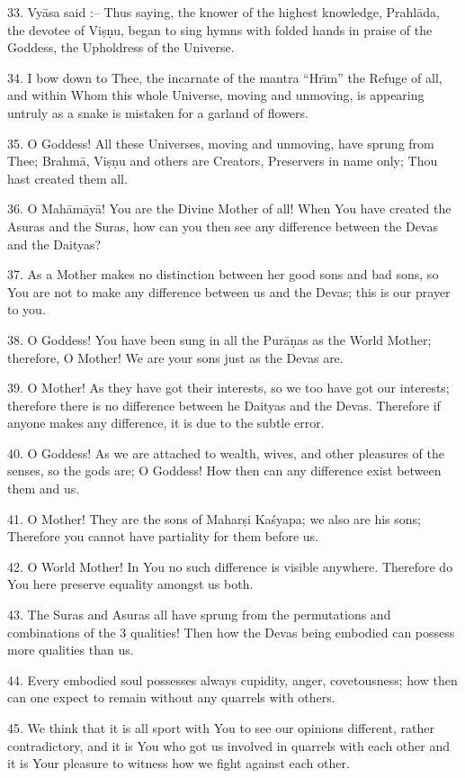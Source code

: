33. Vy\=asa said :-- Thus saying, the knower of the highest knowledge, Prahl\=ada, the devotee of Vi\d{s}\d{n}u, began to sing hymns with folded hands in praise of the Goddess, the Upholdress of the Universe.

34. I bow down to Thee, the incarnate of the mantra ``Hr\={\i}m'' the Refuge of all, and within Whom this whole Universe, moving and unmoving, is appearing untruly as a snake is mistaken for a garland of flowers.

35. O Goddess! All these Universes, moving and unmoving, have sprung from Thee; Brahm\=a, Vi\d{s}\d{n}u and others are Creators, Preservers in name only; Thou hast created them all.

36. O Mah\=am\=ay\=a! You are the Divine Mother of all! When You have created the Asuras and the Suras, how can you then see any difference between the Devas and the Daityas?

37. As a Mother makes no distinction between her good sons and bad sons, so You are not to make any difference between us and the Devas; this is our prayer to you.

38. O Goddess! You have been sung in all the Pur\=a\d{n}as as the World Mother; therefore, O Mother! We are your sons just as the Devas are.

39. O Mother! As they have got their interests, so we too have got our interests; therefore there is no difference between he Daityas and the Devas. Therefore if anyone makes any difference, it is due to the subtle error.

40. O Goddess! As we are attached to wealth, wives, and other pleasures of the senses, so the gods are; O Goddess! How then can any difference exist between them and us.

41. O Mother! They are the sons of Mahar\d{s}i Ka\'syapa; we also are his sons; Therefore you cannot have partiality for them before us.

42. O World Mother! In You no such difference is visible anywhere. Therefore do You here preserve equality amongst us both.

43. The Suras and Asuras all have sprung from the permutations and combinations of the 3 qualities! Then how the Devas being embodied can possess more qualities than us.

44. Every embodied soul possesses always cupidity, anger, covetousness; how then can one expect to remain without any quarrels with others.

45. We think that it is all sport with You to see our opinions different, rather contradictory, and it is You who got us involved in quarrels with each other and it is Your pleasure to witness how we fight against each other.

